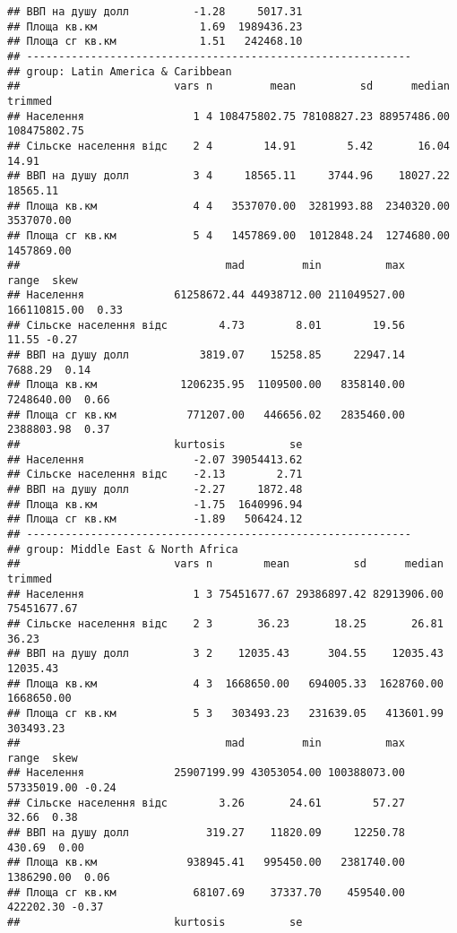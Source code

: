 \documentclass[
]{article}
\begin{document}
\begin{verbatim}
## ВВП на душу долл          -1.28     5017.31
## Площа кв.км                1.69  1989436.23
## Площа сг кв.км             1.51   242468.10
## ------------------------------------------------------------ 
## group: Latin America & Caribbean
##                        vars n         mean          sd      median      trimmed
## Населення                 1 4 108475802.75 78108827.23 88957486.00 108475802.75
## Сільске населення відс    2 4        14.91        5.42       16.04        14.91
## ВВП на душу долл          3 4     18565.11     3744.96    18027.22     18565.11
## Площа кв.км               4 4   3537070.00  3281993.88  2340320.00   3537070.00
## Площа сг кв.км            5 4   1457869.00  1012848.24  1274680.00   1457869.00
##                                mad         min          max        range  skew
## Населення              61258672.44 44938712.00 211049527.00 166110815.00  0.33
## Сільске населення відс        4.73        8.01        19.56        11.55 -0.27
## ВВП на душу долл           3819.07    15258.85     22947.14      7688.29  0.14
## Площа кв.км             1206235.95  1109500.00   8358140.00   7248640.00  0.66
## Площа сг кв.км           771207.00   446656.02   2835460.00   2388803.98  0.37
##                        kurtosis          se
## Населення                 -2.07 39054413.62
## Сільске населення відс    -2.13        2.71
## ВВП на душу долл          -2.27     1872.48
## Площа кв.км               -1.75  1640996.94
## Площа сг кв.км            -1.89   506424.12
## ------------------------------------------------------------ 
## group: Middle East & North Africa
##                        vars n        mean          sd      median     trimmed
## Населення                 1 3 75451677.67 29386897.42 82913906.00 75451677.67
## Сільске населення відс    2 3       36.23       18.25       26.81       36.23
## ВВП на душу долл          3 2    12035.43      304.55    12035.43    12035.43
## Площа кв.км               4 3  1668650.00   694005.33  1628760.00  1668650.00
## Площа сг кв.км            5 3   303493.23   231639.05   413601.99   303493.23
##                                mad         min          max       range  skew
## Населення              25907199.99 43053054.00 100388073.00 57335019.00 -0.24
## Сільске населення відс        3.26       24.61        57.27       32.66  0.38
## ВВП на душу долл            319.27    11820.09     12250.78      430.69  0.00
## Площа кв.км              938945.41   995450.00   2381740.00  1386290.00  0.06
## Площа сг кв.км            68107.69    37337.70    459540.00   422202.30 -0.37
##                        kurtosis          se

\end{verbatim}
\end{document}
